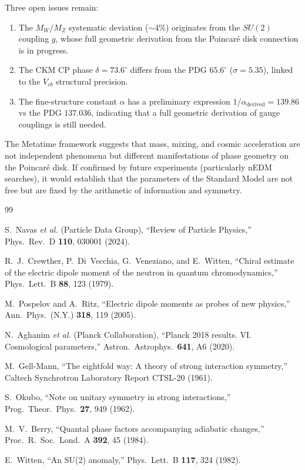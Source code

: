\documentclass[aps,prd,reprint,twocolumn,showpacs,superscriptaddress]{revtex4-2}
\begin{document}
Three open issues remain:
\begin{enumerate}
\item The $M_W/M_Z$ systematic deviation ($\sim 4\%$) originates
from the $SU(2)$ coupling $g$, whose full geometric derivation from
the Poincar\'{e} disk connection is in progress.
\item The CKM CP phase $\delta = 73.6^\circ$ differs from the PDG
$65.6^\circ$ ($\sigma = 5.35$), linked to the $V_{cb}$ structural
precision.
\item The fine-structure constant $\alpha$ has a preliminary expression
$1/\alpha_{\text{derived}} = 139.86$ vs the PDG $137.036$, indicating
that a full geometric derivation of gauge couplings is still needed.
\end{enumerate}

The Metatime framework suggests that mass, mixing, and cosmic
acceleration are not independent phenomena but different manifestations
of phase geometry on the Poincar\'{e} disk.  If confirmed by future
experiments (particularly nEDM searches), it would establish that the
parameters of the Standard Model are not free but are fixed by the
arithmetic of information and symmetry.

\begin{thebibliography}{99}

S.~Navas \emph{et al.} (Particle Data Group),
``Review of Particle Physics,''
Phys.\ Rev.\ D \textbf{110}, 030001 (2024).

R.~J.~Crewther, P.~Di~Vecchia, G.~Veneziano, and E.~Witten,
``Chiral estimate of the electric dipole moment of the neutron in
quantum chromodynamics,''
Phys.\ Lett.\ B \textbf{88}, 123 (1979).

M.~Pospelov and A.~Ritz,
``Electric dipole moments as probes of new physics,''
Ann.\ Phys.\ (N.Y.) \textbf{318}, 119 (2005).

N.~Aghanim \emph{et al.} (Planck Collaboration),
``Planck 2018 results. VI. Cosmological parameters,''
Astron.\ Astrophys.\ \textbf{641}, A6 (2020).

M.~Gell-Mann,
``The eightfold way: A theory of strong interaction symmetry,''
Caltech Synchrotron Laboratory Report CTSL-20 (1961).

S.~Okubo,
``Note on unitary symmetry in strong interactions,''
Prog.\ Theor.\ Phys.\ \textbf{27}, 949 (1962).

M.~V.~Berry,
``Quantal phase factors accompanying adiabatic changes,''
Proc.\ R.\ Soc.\ Lond.\ A \textbf{392}, 45 (1984).

E.~Witten,
``An SU(2) anomaly,''
Phys.\ Lett.\ B \textbf{117}, 324 (1982).

\end{thebibliography}
\end{document}
